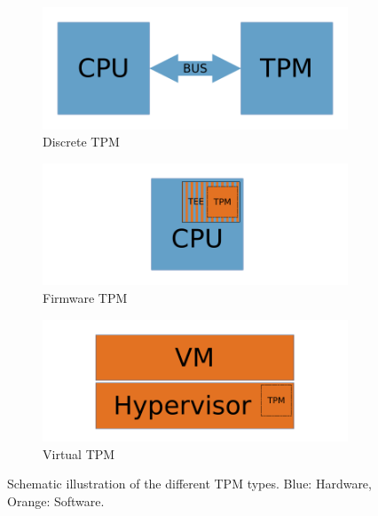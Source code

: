 \begin{figure}
    \centering
    \begin{subfigure}{0.49\textwidth}
      \includegraphics[width=\linewidth]{figures/dTPM.pdf}
      \caption{Discrete TPM} \label{fig:dtpm}
    \end{subfigure}%
    \hspace*{\fill}   %
    \begin{subfigure}{0.49\textwidth}
      \includegraphics[width=\linewidth]{figures/fTPM.pdf}
      \caption{Firmware TPM} \label{fig:ftpm}
    \end{subfigure}%

    \begin{subfigure}{0.49\textwidth}
      \includegraphics[width=\linewidth]{figures/vTPM.pdf}
      \caption{Virtual TPM} \label{fig:vtpm}
    \end{subfigure}%
  
  \caption{Schematic illustration of the different TPM types. Blue: Hardware, Orange: Software.} \label{fig:tpm_types}
  \end{figure}

